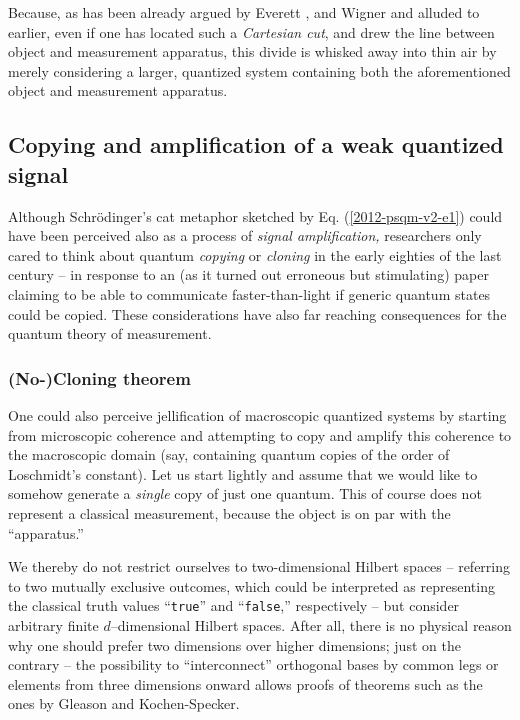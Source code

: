 \documentclass[%
  preprint,
 showpacs,
 showkeys,
 preprintnumbers,
 amsmath,amssymb,
 aps,
   pra,
  longbibliography,
 ]{revtex4-1}
\begin{document}
Because, as has been already argued by  Everett \cite[p.~454]{everett}, and Wigner \cite[p.~173]{wigner:mb} and alluded to earlier,
even if one has located such a {\em Cartesian cut}, and drew the line between object and measurement apparatus,
this divide is whisked away into thin air by merely considering a larger, quantized system containing both the
aforementioned  object  and measurement apparatus.

\subsection{Copying and amplification of a weak quantized signal}

Although Schr\"odinger's cat metaphor sketched by Eq.
(\ref{2012-psqm-v2-e1}) could have been perceived also as a process of {\em signal amplification,}
researchers only cared to think about quantum
{\em copying} or
{\em cloning}
in the early eighties of the last century
--
in response to an (as it turned out erroneous but stimulating)
paper %
claiming to be able to communicate faster-than-light
if generic quantum states could be copied.
These considerations have also far reaching consequences for the quantum theory of measurement.


\subsubsection{(No-)Cloning theorem}

One could also perceive jellification of macroscopic quantized systems by
starting from microscopic coherence and attempting to copy and amplify this coherence to the macroscopic domain
(say, containing quantum copies of the order of Loschmidt's constant).
Let us start lightly and assume that we would like to somehow generate a {\em single} copy of just one quantum.
This of course does  not represent a classical measurement, because the object is on par with the ``apparatus.''

We thereby do not restrict ourselves to two-dimensional Hilbert spaces
--
referring to two mutually exclusive outcomes,
which could be interpreted as representing the classical truth values
``{\tt true}''
and
``{\tt false},''
respectively
--
but consider arbitrary finite $d$--dimensional Hilbert spaces.
After all, there is no physical reason why one should prefer two dimensions over higher dimensions; just on the contrary
-- the possibility to ``interconnect'' orthogonal bases by common legs or elements
from three dimensions onward allows proofs of theorems such as the ones by Gleason and Kochen-Specker.
\end{document}

